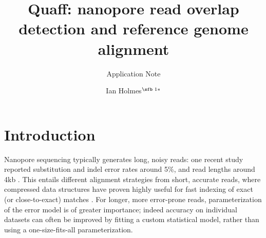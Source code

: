 \documentclass{bioinfo}
\begin{document}

\subtitle{Application Note}

\title[Quaff: alignment to nanopore reads]{Quaff: nanopore read overlap detection and reference genome alignment}
\author[Ian Holmes]{Ian Holmes$^{\text{\sfb 1}*}$}
\address{$^{\text{\sf 1}}$Department of Bioengineering, University of California, Berkeley, 94703, USA.}





\maketitle

\section{Introduction}

Nanopore sequencing typically generates long, noisy reads: one recent study reported substitution and indel error rates around 5\%, and read lengths around 4kb \citep{Jain2015-by}. This entails different alignment strategies from short, accurate reads, where compressed data structures have proven highly useful for fast indexing of exact (or close-to-exact) matches \citep{Lindner2012-tx}. For longer, more error-prone reads, parameterization of the error model is of greater importance; indeed accuracy on individual datasets can often be improved by fitting a custom statistical model, rather than using a one-size-fits-all parameterization.
\end{document}
